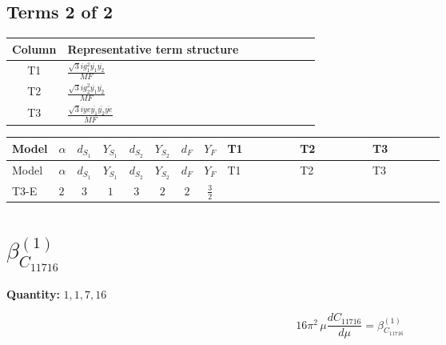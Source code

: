 \documentclass[8pt]{article}
\begin{document}
\begin{landscape}
\subsection*{Terms 2 of 2}
\begin{center}
\begin{tabular}{@{}c >{\raggedright\arraybackslash}p{0.82\linewidth}@{}}
\toprule
Column & Representative term structure \\
\midrule
T1 & \(\displaystyle \frac{\sqrt{3} i g_{1}^{2} \overline{y_{1}} \overline{y_{2}}}{MF}\) \\
\midrule
T2 & \(\displaystyle \frac{\sqrt{3} i g_{2}^{2} \overline{y_{1}} \overline{y_{2}}}{MF}\) \\
\midrule
T3 & \(\displaystyle \frac{\sqrt{3} i ye \overline{y_{1}} \overline{y_{2}} \overline{ye}}{MF}\) \\
\midrule
\bottomrule
\end{tabular}
\end{center}
\smallskip
\tiny
\begin{longtable}{@{}llcccccc >{\raggedright\arraybackslash}p{0.21\linewidth} >{\raggedright\arraybackslash}p{0.21\linewidth} >{\raggedright\arraybackslash}p{0.21\linewidth}@{}}
\toprule
Model & $\alpha$ & $d_{S_1}$ & $Y_{S_1}$ & $d_{S_2}$ & $Y_{S_2}$ & $d_F$ & $Y_F$ & T1 & T2 & T3 \\
\midrule
\endfirsthead
\toprule
Model & $\alpha$ & $d_{S_1}$ & $Y_{S_1}$ & $d_{S_2}$ & $Y_{S_2}$ & $d_F$ & $Y_F$ & T1 & T2 & T3 \\
\midrule
\endhead
T3-E & $2$ & $3$ & $1$ & $3$ & $2$ & $2$ & $\frac{3}{2}$ & \scriptsize\adjustbox{max width=\linewidth}{$\begin{gathered} \frac{9 \sqrt{3} i g_{1}^{2} \overline{y_{1}} \overline{y_{2}}}{8 MF}\end{gathered}$} & \scriptsize\adjustbox{max width=\linewidth}{$\begin{gathered} \frac{11 \sqrt{3} i g_{2}^{2} \overline{y_{1}} \overline{y_{2}}}{8 MF}\end{gathered}$} & \scriptsize\adjustbox{max width=\linewidth}{$\begin{gathered} - \frac{\sqrt{3} i ye \overline{y_{1}} \overline{y_{2}} \overline{ye}}{12 MF}\end{gathered}$} \\
\midrule
\bottomrule
\end{longtable}
\clearpage
\section*{$\beta_{C_{11716}}^{(1)}$}
\noindent\textbf{Quantity: }$\mathrm{1,1,7,16}$\par\smallskip
\[16\pi^2\,\mu\frac{d C_{11716}}{d\mu}=\beta_{C_{11716}}^{(1)}\]

\end{landscape}
\end{document}
